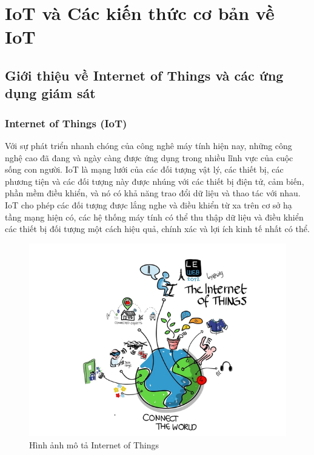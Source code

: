 
\chapter{IoT và Các kiến thức cơ bản về IoT}

\ifpdf
    \graphicspath{{Chapter2/Figs/Raster/}{Chapter2/Figs/PDF/}{Chapter2/Figs/}{Chapter2/Figs/web/}}
\else
    \graphicspath{{Chapter2/Figs/Vector/}{Chapter2/Figs/}}
\fi


\section{Giới thiệu về Internet of Things và các ứng dụng giám sát}
\subsection{Internet of Things (IoT)}
Với sự phát triển nhanh chóng của công nghê máy tính hiện nay, những công nghệ cao đã đang và ngày càng được ứng dụng trong nhiều lĩnh vực của cuộc sống con người. IoT là mạng lưới của các đối tượng vật lý, các thiết bị, các phương tiện và các đối tượng này được nhúng với các thiết bị điện tử, cảm biến, phần mềm điều khiển, và nó có khả năng trao đổi dữ liệu và thao tác với nhau. IoT cho phép các đối tượng được lắng nghe và điều khiển từ xa trên cơ sở hạ tầng mạng hiện có, các hệ thống máy tính có thể thu thập dữ liệu và điều khiển các thiết bị đối tượng một cách hiệu quả, chính xác và lợi ích kinh tế nhất có thể. 
\begin{figure}[htbp!] 
\centering    
\includegraphics[width=1.0\textwidth]{pic4}
\caption[Hình ảnh mô tả Internet of Things ]{Hình ảnh mô tả Internet of Things }
\label{fig:pic4}
\end{figure}


